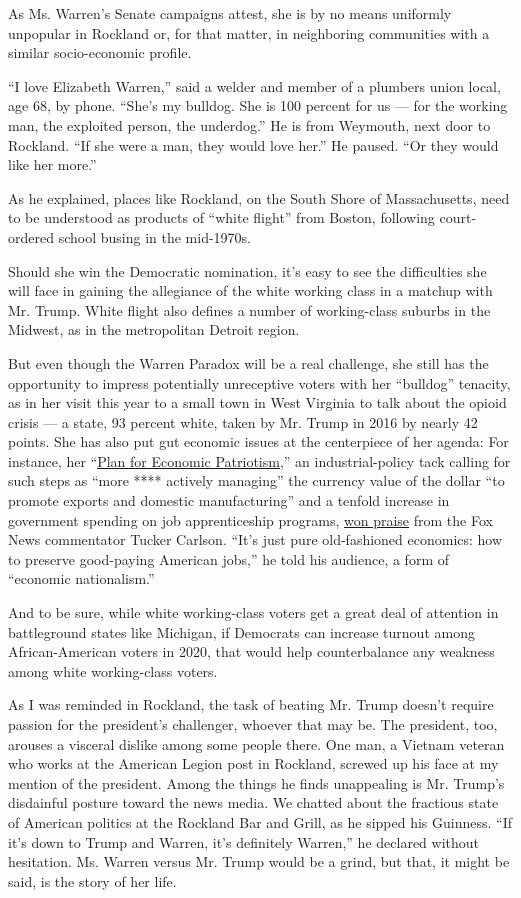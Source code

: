 As Ms. Warren's Senate campaigns attest, she is by no means uniformly
unpopular in Rockland or, for that matter, in neighboring communities
with a similar socio-economic profile.

``I love Elizabeth Warren,'' said a welder and member of a plumbers
union local, age 68, by phone. ``She's my bulldog. She is 100 percent
for us --- for the working man, the exploited person, the underdog.'' He
is from Weymouth, next door to Rockland. ``If she were a man, they would
love her.'' He paused. ``Or they would like her more.''

As he explained, places like Rockland, on the South Shore of
Massachusetts, need to be understood as products of ``white flight''
from Boston, following court-ordered school busing in the mid-1970s.

Should she win the Democratic nomination, it's easy to see the
difficulties she will face in gaining the allegiance of the white
working class in a matchup with Mr. Trump. White flight also defines a
number of working-class suburbs in the Midwest, as in the metropolitan
Detroit region.

But even though the Warren Paradox will be a real challenge, she still
has the opportunity to impress potentially unreceptive voters with her
``bulldog'' tenacity, as in her visit this year to a small town in West
Virginia to talk about the opioid crisis --- a state, 93 percent white,
taken by Mr. Trump in 2016 by nearly 42 points. She has also put gut
economic issues at the centerpiece of her agenda: For instance, her
``\href{https://medium.com/@teamwarren/a-plan-for-economic-patriotism-13b879f4cfc7}{Plan
for Economic Patriotism},'' an industrial-policy tack calling for such
steps as ``more **** actively managing'' the currency value of the
dollar ``to promote exports and domestic manufacturing'' and a tenfold
increase in government spending on job apprenticeship programs,
\href{https://www.youtube.com/watch?v=SUW8kbZyucI}{won praise} from the
Fox News commentator Tucker Carlson. ``It's just pure old-fashioned
economics: how to preserve good-paying American jobs,'' he told his
audience, a form of ``economic nationalism.''

And to be sure, while white working-class voters get a great deal of
attention in battleground states like Michigan, if Democrats can
increase turnout among African-American voters in 2020, that would help
counterbalance any weakness among white working-class voters.

As I was reminded in Rockland, the task of beating Mr. Trump doesn't
require passion for the president's challenger, whoever that may be. The
president, too, arouses a visceral dislike among some people there. One
man, a Vietnam veteran who works at the American Legion post in
Rockland, screwed up his face at my mention of the president. Among the
things he finds unappealing is Mr. Trump's disdainful posture toward the
news media. We chatted about the fractious state of American politics at
the Rockland Bar and Grill, as he sipped his Guinness. ``If it's down to
Trump and Warren, it's definitely Warren,'' he declared without
hesitation. Ms. Warren versus Mr. Trump would be a grind, but that, it
might be said, is the story of her life.

